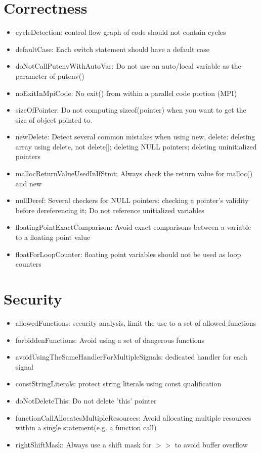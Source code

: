 \section{Correctness}
\begin{itemize}
\item cycleDetection: control flow graph of code should not contain cycles
\item defaultCase: Each switch statement should have a default case
\item doNotCallPutenvWithAutoVar: Do not use an auto/local variable as the parameter of putenv()
\item noExitInMpiCode: No exit() from within a parallel code portion (MPI)
\item sizeOfPointer: Do not computing sizeof(pointer) when you want to get the size of object pointed to. 
\item newDelete: Detect several common mistakes when using new, delete: deleting array using delete, not delete[]; deleting NULL pointers; deleting uninitialized pointers
\item mallocReturnValueUsedInIfStmt: Always check the return value for malloc() and new
\item nullDeref: Several checkers for NULL pointers: checking a pointer's validity before dereferencing it; Do not reference unitialized variables
\item floatingPointExactComparison: Avoid exact comparisons between a variable to a floating point value
\item floatForLoopCounter:  floating point variables should not be used as loop counters
\end{itemize}

\section{Security}
\begin{itemize}
\item allowedFunctions: security analysis, limit the use to a set of allowed functions
\item forbiddenFunctions: Avoid using a set of dangerous functions
\item avoidUsingTheSameHandlerForMultipleSignals: dedicated handler for each signal
\item constStringLiterals: protect string literals using const qualification
\item doNotDeleteThis: Do not delete 'this' pointer
\item functionCallAllocatesMultipleResources: Avoid allocating multiple resources within a single statement(e.g. a function call)
\item rightShiftMask: Always use a shift mask for $>>$ to avoid buffer overflow
\end{itemize}

